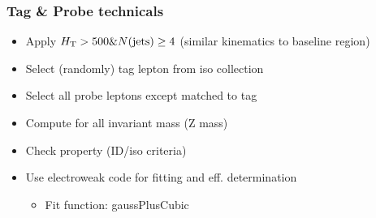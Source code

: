 \documentclass{beamer}
\begin{document}
\begin{frame}
 \frametitle{Tag \& Probe technicals}
 \begin{itemize}
 \item Apply $H_{\text{T}}>500 \& N(\text{jets})\geq4$ (similar kinematics to baseline region)
  \item Select (randomly) tag lepton from iso collection
  \item Select all probe leptons except matched to tag
  \item Compute for all invariant mass (Z mass)
  \item Check property (ID/iso criteria)
  \item Use electroweak code for fitting and eff. determination
  \begin{itemize}
   \item Fit function: gaussPlusCubic
  \end{itemize}

 \end{itemize}

\end{frame}
\end{document}
